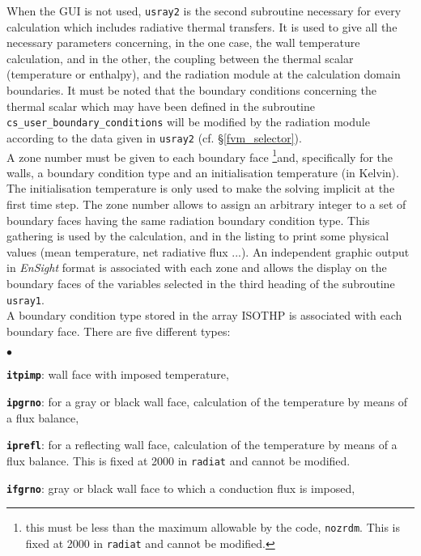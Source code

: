 {{{When the GUI is not used, \texttt{usray2} is the second subroutine necessary for every calculation which includes radiative thermal transfers. It is used to give all the
necessary parameters concerning, in the one case, the wall temperature
calculation, and in the other, the coupling between the thermal
scalar (temperature or enthalpy), and the radiation module at the
calculation domain boundaries. It must be noted that the boundary conditions
concerning the thermal scalar which may have been defined in the
subroutine \texttt{cs\_user\_boundary\_conditions} will be modified by the radiation module
according to the data given in \texttt{usray2} (cf. \S\ref{fvm_selector}).\\
A zone number must be given to each boundary face \footnote{this must be less
 than the maximum allowable by the code, \texttt{nozrdm}. This is fixed at 2000
 in \texttt{radiat} and cannot be modified.}and, specifically for
the walls, a boundary condition type and an initialisation temperature
(in Kelvin). The initialisation temperature is only used to make the
solving implicit at the first time step. The zone number allows to assign
an arbitrary integer to a set of boundary faces having the same
radiation boundary condition type. This gathering is used by the
calculation, and in the listing to print some physical values (mean
temperature, net radiative flux ...). An independent graphic output in
{\em EnSight} format is associated with each zone and allows the display on
the boundary faces of the variables selected in the third heading of the
subroutine \texttt{usray1}.\\
A boundary condition type stored in the array ISOTHP is associated with
each boundary face. There are five different types:

\begin{list}{$\bullet$}{}

\item \texttt{\textbf{itpimp}}: wall face with imposed temperature,

\item \texttt{\textbf{ipgrno}}: for a gray or black wall face, calculation of the
      temperature by means of a flux balance,

\item \texttt{\textbf{iprefl}}: for a reflecting wall face, calculation of the
      temperature by means of a flux balance.
 This is fixed at 2000 in \texttt{radiat} and cannot be modified.

\item \texttt{\textbf{ifgrno}}: gray or black wall face to which a conduction
      flux is imposed,


\end{list}}}}
